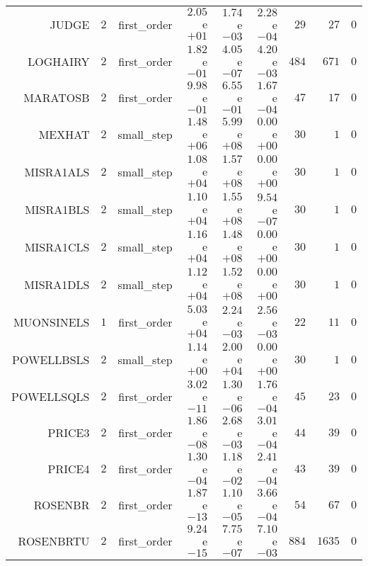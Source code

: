 \begin{longtable}{rrrrrrrrr}
JUDGE & \(     2\) & first\_order & \( 2.05\)e\(+01\) & \( 1.74\)e\(-03\) & \( 2.28\)e\(-04\) & \(    29\) & \(    27\) & \(     0\) \\
LOGHAIRY & \(     2\) & first\_order & \( 1.82\)e\(-01\) & \( 4.05\)e\(-07\) & \( 4.20\)e\(-03\) & \(   484\) & \(   671\) & \(     0\) \\
MARATOSB & \(     2\) & first\_order & \( 9.98\)e\(-01\) & \( 6.55\)e\(-01\) & \( 1.67\)e\(-04\) & \(    47\) & \(    17\) & \(     0\) \\
MEXHAT & \(     2\) & small\_step & \( 1.48\)e\(+06\) & \( 5.99\)e\(+08\) & \( 0.00\)e\(+00\) & \(    30\) & \(     1\) & \(     0\) \\
MISRA1ALS & \(     2\) & small\_step & \( 1.08\)e\(+04\) & \( 1.57\)e\(+08\) & \( 0.00\)e\(+00\) & \(    30\) & \(     1\) & \(     0\) \\
MISRA1BLS & \(     2\) & small\_step & \( 1.10\)e\(+04\) & \( 1.55\)e\(+08\) & \( 9.54\)e\(-07\) & \(    30\) & \(     1\) & \(     0\) \\
MISRA1CLS & \(     2\) & small\_step & \( 1.16\)e\(+04\) & \( 1.48\)e\(+08\) & \( 0.00\)e\(+00\) & \(    30\) & \(     1\) & \(     0\) \\
MISRA1DLS & \(     2\) & small\_step & \( 1.12\)e\(+04\) & \( 1.52\)e\(+08\) & \( 0.00\)e\(+00\) & \(    30\) & \(     1\) & \(     0\) \\
MUONSINELS & \(     1\) & first\_order & \( 5.03\)e\(+04\) & \( 2.24\)e\(-03\) & \( 2.56\)e\(-03\) & \(    22\) & \(    11\) & \(     0\) \\
POWELLBSLS & \(     2\) & small\_step & \( 1.14\)e\(+00\) & \( 2.00\)e\(+04\) & \( 0.00\)e\(+00\) & \(    30\) & \(     1\) & \(     0\) \\
POWELLSQLS & \(     2\) & first\_order & \( 3.02\)e\(-11\) & \( 1.30\)e\(-06\) & \( 1.76\)e\(-04\) & \(    45\) & \(    23\) & \(     0\) \\
PRICE3 & \(     2\) & first\_order & \( 1.86\)e\(-08\) & \( 2.68\)e\(-03\) & \( 3.01\)e\(-04\) & \(    44\) & \(    39\) & \(     0\) \\
PRICE4 & \(     2\) & first\_order & \( 1.30\)e\(-04\) & \( 1.18\)e\(-02\) & \( 2.41\)e\(-04\) & \(    43\) & \(    39\) & \(     0\) \\
ROSENBR & \(     2\) & first\_order & \( 1.87\)e\(-13\) & \( 1.10\)e\(-05\) & \( 3.66\)e\(-04\) & \(    54\) & \(    67\) & \(     0\) \\
ROSENBRTU & \(     2\) & first\_order & \( 9.24\)e\(-15\) & \( 7.75\)e\(-07\) & \( 7.10\)e\(-03\) & \(   884\) & \(  1635\) & \(     0\) \\

\end{longtable}
